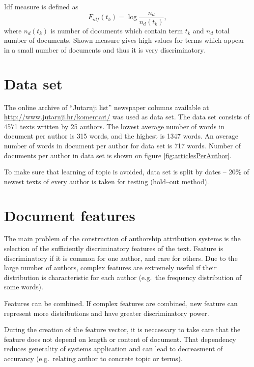 \documentclass[11pt,english]{article}
\begin{document}
\begin{multicols}{2}
Idf measure is defined as
\begin{equation}
F_{idf}(t_k) = \log \frac{n_d}{n_d(t_k)},
\label{equ:idf}
\end{equation}
where $n_d(t_k)$ is number of documents which contain term $t_k$ and $n_d$
total number of documents. Shown measure gives high values for terms which
appear in a small number of documents and thus it is very discriminatory.

\section{Data set}
\label{sec:podatci}
The online archive of ``Jutarnji list'' newspaper columns available at
\url{http://www.jutarnji.hr/komentari/} was used as data set. The data set
consists of 4571 texts written by 25 authors. The lowest average number of words
in document per author is 315 words, and the highest is 1347 words. An
average number of words in document per author for data set is 717 words. Number
of documents per author in data set is shown on figure
\ref{fig:articlesPerAuthor}.

To make sure that learning of topic is avoided, data set is split by dates
-- 20\% of newest texts of every author is taken for testing (hold--out method).

\begin{minipage}{0.8\linewidth}
\vspace{10pt}
\centerline{\resizebox{1.4\linewidth}{!}{}}%
%
\label{fig:articlesPerAuthor}
\end{minipage}

\section{Document features}
The main problem of the construction of authorship attribution systems is the
selection of the sufficiently discriminatory features of the text. Feature is
discriminatory if it is common for one author, and rare for others. Due to the
large number of authors, complex features are extremely useful if their
distribution is characteristic for each author (e.g.\ the frequency distribution
of some words).

Features can be combined. If complex features are combined, new feature can
represent more distributions and have greater discriminatory power.

During the creation of the feature vector, it is neccessary to take care that the
feature does not depend on length or content of document. That dependency reduces
generality of systems application and can lead to decreasment of accurancy
(e.g.\ relating author to concrete topic or terms).


\end{multicols}
\end{document}
